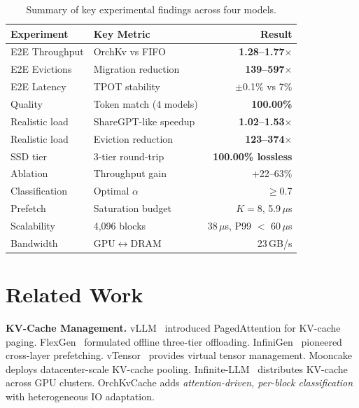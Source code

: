 \documentclass[conference]{IEEEtran}
\begin{document}
\begin{table}[t]
\centering
\caption{Summary of key experimental findings across four models.}
\label{tab:summary}
\small
\begin{tabular}{@{}llr@{}}
\toprule
Experiment & Key Metric & Result \\
\midrule
E2E Throughput  & OrchKv vs FIFO        & \textbf{1.28--1.77$\times$} \\
E2E Evictions   & Migration reduction    & \textbf{139--597$\times$} \\
E2E Latency     & TPOT stability         & $\pm$0.1\% vs 7\% \\
Quality         & Token match (4 models) & \textbf{100.00\%} \\
Realistic load  & ShareGPT-like speedup  & \textbf{1.02--1.53$\times$} \\
Realistic load  & Eviction reduction     & \textbf{123--374$\times$} \\
SSD tier        & 3-tier round-trip      & \textbf{100.00\% lossless} \\
Ablation        & Throughput gain        & +22--63\% \\
Classification  & Optimal $\alpha$       & $\geq$0.7 \\
Prefetch        & Saturation budget      & $K{=}8$, 5.9\,$\mu$s \\
Scalability     & 4,096 blocks           & 38\,$\mu$s, P99 $<$ 60\,$\mu$s \\
Bandwidth       & GPU$\leftrightarrow$DRAM & 23\,GB/s \\
\bottomrule
\end{tabular}
\end{table}

\section{Related Work}

\textbf{KV-Cache Management.} vLLM~\cite{vllm} introduced PagedAttention for KV-cache paging. FlexGen~\cite{flexgen} formulated offline three-tier offloading. InfiniGen~\cite{infinigen} pioneered cross-layer prefetching. vTensor~\cite{vtensor} provides virtual tensor management. Mooncake~\cite{mooncake} deploys datacenter-scale KV-cache pooling. Infinite-LLM~\cite{infinitellm} distributes KV-cache across GPU clusters. OrchKvCache adds \emph{attention-driven, per-block classification} with heterogeneous IO adaptation.
\end{document}
